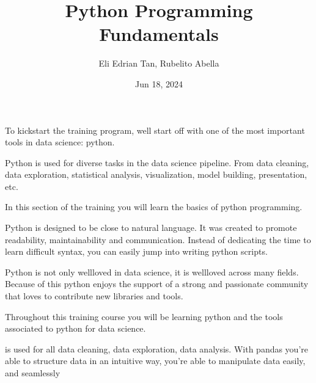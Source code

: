\documentclass[letterpaper,10pt,english]{jupyterBook}
\title{Python Programming Fundamentals}
\date{Jun 18, 2024}
\author{Eli Edrian Tan, Rubelito Abella}
\begin{document}
\pagestyle{empty}
\sphinxmaketitle
\pagestyle{plain}
\sphinxtableofcontents
\pagestyle{normal}
\label{\detokenize{intro::doc}}


\sphinxAtStartPar
To kickstart the training program, well start off with one of the most important tools in data science: python.

\sphinxAtStartPar
Python is used for diverse tasks in the data science pipeline. From data cleaning, data exploration, statistical analysis, visualization, model building, presentation, etc.

\sphinxAtStartPar
In this section of the training you will learn the basics of python programming.

\begin{DUlineblock}{0em}
\item[] 
\end{DUlineblock}

\sphinxAtStartPar
Python is designed to be close to natural language. It was created to promote readability, maintainability and communication. Instead of dedicating the time to learn difficult syntax, you can easily jump into writing python scripts.

\begin{DUlineblock}{0em}
\item[] 
\end{DUlineblock}

\sphinxAtStartPar
Python is not only well\sphinxhyphen{}loved in data science, it is well\sphinxhyphen{}loved across many fields. Because of this python enjoys the support of a strong and passionate community that loves to contribute new libraries and tools.

\begin{DUlineblock}{0em}
\item[] 
\end{DUlineblock}

\sphinxAtStartPar
Throughout this training course you will be learning python and the tools associated to python for data science.

\begin{DUlineblock}{0em}
\item[] 
\end{DUlineblock}

\sphinxAtStartPar
{} is used for all data cleaning, data exploration, data analysis. With pandas you’re able to structure data in an intuitive way, you’re able to manipulate data easily, and seamlessly
\end{document}
